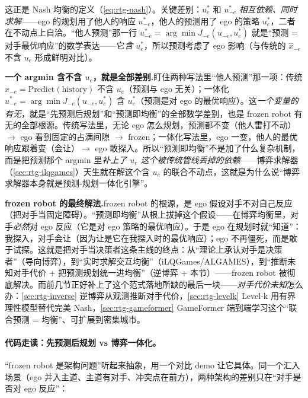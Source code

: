 \noindent 这正是 Nash 均衡的定义（\cref{eq:rtg-nash}）。关键差别：$u_e^*$ 和 $u_{-e}^*$ \emph{相互依赖、同时求解}——ego 的规划用了他人的响应 $u_{-e}^*$，他人的预测用了 ego 的策略 $u_e^*$，二者在不动点上自洽。“他人预测”那一行 $u_{-e}^*=\arg\min J_{-e}(u_{-e},u_e^*)$ 就是“预测 = 对手最优响应”的数学表达——它\emph{含} $u_e^*$，所以预测考虑了 ego 影响（与传统的 $\hat x_{-e}$ 不含 $u_e$ 形成鲜明对比）。

\begin{insight}
\textbf{一个 argmin 含不含 $u_e$，就是全部差别.}\;盯住两种写法里“他人预测”那一项：传统 $\hat x_{-e}=\mathrm{Predict}(\text{history})$ 不含 $u_e$（预测与 ego 无关）；一体化 $u_{-e}^*=\arg\min J_{-e}(u_{-e},u_e^*)$ 含 $u_e^*$（预测是对 ego 的最优响应）。这\emph{一个变量的有无}，就是“先预测后规划”和“预测即均衡”的全部数学差别，也是 frozen robot 有无的全部根源。传统写法里，无论 ego 怎么规划，预测都不变（他人雷打不动）$\to$ ego 看到固定的占满间隙 $\to$ frozen；一体化写法里，ego 一变，他人的最优响应跟着变（会让）$\to$ ego 敢探入。所以“预测即均衡”不是加了什么复杂机制，而是把预测那个 argmin 里\emph{补上了 $u_e$ 这个被传统管线丢掉的依赖}——博弈求解器（\cref{sec:rtg-ilqgames}）天生就在解这个含 $u_e$ 的联合不动点，这就是为什么说“博弈求解器本身就是预测-规划一体化引擎”。
\end{insight}

\begin{insight}
\textbf{frozen robot 的最终解法.}\;frozen robot 的根源，是 ego 假设对手不对自己反应（把对手当固定障碍）。“预测即均衡”从根上拔掉这个假设——在博弈均衡里，对手\emph{必然}对 ego 反应（它是对 ego 策略的最优响应）。于是 ego 在规划时就“知道”：我探入，对手会让（因为让是它在我探入时的最优响应）；ego 不再僵死，而是敢于试探。这就是把对手当决策者这条主线的终点：从“理论上承认对手是决策者”（导向博弈），到“实时求解交互均衡”（iLQGames/ALGAMES），到“推断未知对手代价 + 把预测规划统一进均衡”（逆博弈 + 本节）——frozen robot 被彻底解决。而前几节正好补上了这个范式落地所缺的最后一块——\emph{对手代价未知}怎么办：\cref{sec:rtg-inverse} 逆博弈从观测推断对手代价，\cref{sec:rtg-levelk} Level-k 用有界理性模型替代完美 Nash，\cref{sec:rtg-gameformer} GameFormer 端到端学习这个“联合预测 = 均衡”、可扩展到密集城市。
\end{insight}

\paragraph{代码走读：先预测后规划 vs 博弈一体化。}
“frozen robot 是架构问题”听起来抽象，用一个对比 demo 让它具体。同一个汇入场景（ego 并入主道、主道有对手、冲突点在前方），两种架构的差别只在“对手是否对 ego 反应”：

